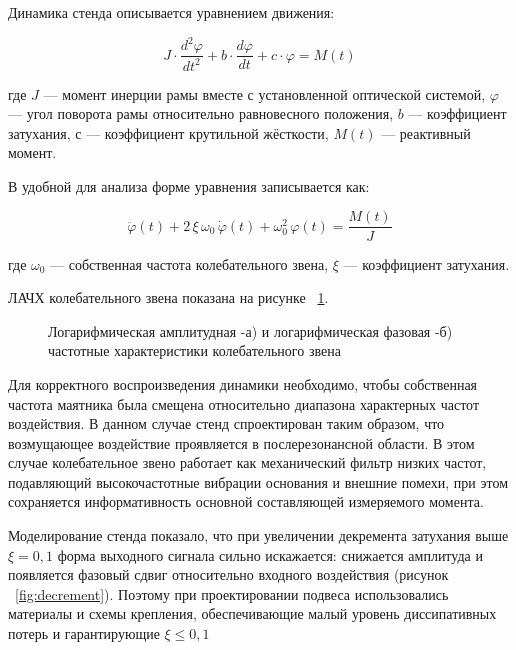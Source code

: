 Динамика стенда описывается уравнением движения:

\begin{equation}
	\label{eq:stadeq}
	J\cdot \frac{d^2\varphi}{dt^2}+b \cdot \frac{d\varphi}{dt}+ c \cdot \varphi = M(t)
\end{equation}

где \(J\) --- момент инерции рамы вместе с установленной оптической системой, \(\varphi\) --- угол поворота рамы относительно равновесного положения, \(b\) --- коэффициент затухания, \(с\) --- коэффициент крутильной жёсткости, \(M(t)\) --- реактивный момент.

В удобной для анализа форме уравнения записывается как:

\begin{equation}
	\label{eq:standeq2}
	\ddot{\varphi}(t) + 2\,\xi\,\omega_0\,\dot{\varphi}(t) + \omega_0^{2}\,\varphi(t)
	= \frac{M(t)}{J}
\end{equation}

где \(\omega_0\) --- собственная частота колебательного звена, \(\xi\) --- коэффициент затухания.

ЛАЧХ колебательного звена показана на рисунке ~\cref{fig:afc}.

\begin{figure}[!h] 
	\caption{Логарифмическая амплитудная -а) и логарифмическая фазовая -б) частотные характеристики колебательного звена}
	\label{fig:afc} 
\end{figure}

Для корректного воспроизведения динамики необходимо, чтобы собственная частота маятника была смещена относительно диапазона характерных частот воздействия. В данном случае стенд спроектирован таким образом, что возмущающее воздействие проявляется в послерезонансной области. В этом случае колебательное звено работает как механический фильтр низких частот, подавляющий высокочастотные вибрации основания и внешние помехи, при этом сохраняется информативность основной составляющей измеряемого момента.

Моделирование стенда показало, что при увеличении декремента затухания выше $\xi=0,1$ форма выходного сигнала сильно искажается: снижается амплитуда и появляется фазовый сдвиг относительно входного воздействия (рисунок ~\cref{fig:decrement}). Поэтому при проектировании подвеса использовались материалы и схемы крепления, обеспечивающие малый уровень диссипативных потерь и гарантирующие $\xi \leq 0,1$

